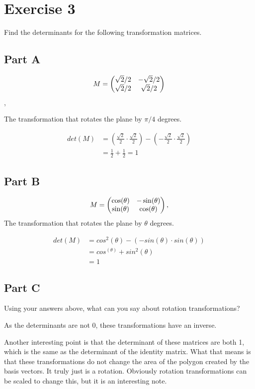 \section*{Exercise 3}

Find the determinants for the following transformation matrices.

\subsection*{Part A}

\[M =  \begin{pmatrix} 
		\sqrt{2}/2 & -\sqrt{2}/2\\
		\sqrt{2}/2 & \sqrt{2}/2
 \end{pmatrix} \],

The transformation that rotates the plane by $\pi / 4$ degrees.

\[
\begin{aligned}
det(M) &= 
\left( \frac{\sqrt{2}}{2} \cdot \frac{\sqrt{2}}{2}\right)
- \left( -\frac{\sqrt{2}}{2} \cdot \frac{\sqrt{2}}{2}\right)
\\ &= \frac{1}{2} + \frac{1}{2} = 1
\end{aligned}
\]

\subsection*{Part B}

\[
M =  \begin{pmatrix} 
	\cos(\theta) & -\sin(\theta)\\
	\sin(\theta) & \cos(\theta)
 \end{pmatrix} ,
\]
The transformation that rotates the plane by $\theta$ degrees.


\[
	\begin{aligned}
		det(M) &= cos^2(\theta) - (-sin(\theta) \cdot sin(\theta)) \\
		&= cos^(\theta) + sin^2(\theta) \\
		&= 1
	\end{aligned}
\]

\subsection*{Part C}

Using your answers above, what can you say about rotation transformations?

As the determinants are not 0, these transformations have an inverse. 

Another interesting point is that the determinant of these matrices are both 1, which is the same as the determinant of the identity matrix. What that means is that these transformations do not change the area of the polygon created by the basis vectors. It truly just is a rotation. Obviously rotation transformations can be scaled to change this, but it is an interesting note. 
